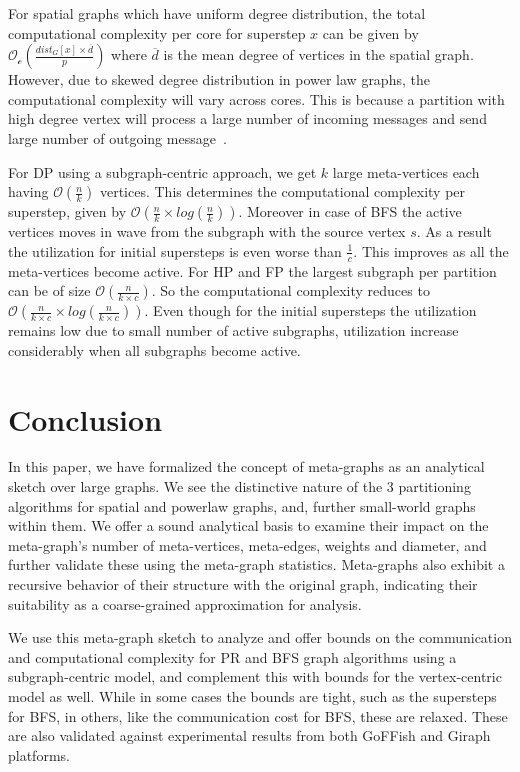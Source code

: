 \documentclass[10pt,conference, compsocconf]{IEEEtran}
\begin{document}
 For spatial graphs which have uniform degree distribution, the total computational complexity per core for superstep $x$ can be given by $\mathcal{O_c}(\frac{dist_G[x] \times \overline{d}}{p})$ where $\overline{d}$ is the mean degree of vertices in the spatial graph. However, due to skewed degree distribution in power law graphs, the computational complexity will vary across cores. This is because a partition with high degree vertex will process a large number of incoming messages and send large number of outgoing message~\cite{graphlab}.
 

For DP using a subgraph-centric approach, we get $k$ large meta-vertices each having $\mathcal{O}(\frac{n}{k})$ vertices. This determines the computational complexity per superstep, given by $\mathcal{O}(\frac{n}{k} \times log(\frac{n}{k}))$. Moreover in case of BFS the active vertices moves in wave from the subgraph with the source vertex $s$. As a result the  utilization  for initial supersteps is even worse than $\frac{1}{c}$. This improves as all the meta-vertices become active. For HP and FP the largest subgraph per partition can be of size $\mathcal{O}(\frac{n}{k \times c})$. So the computational complexity reduces to $\mathcal{O}(\frac{n}{k \times c} \times log(\frac{n}{k \times c}))$. Even though for the initial supersteps the utilization remains low due to small number of active subgraphs, utilization increase considerably when all subgraphs become active.






\section{Conclusion}\label{sec:conclusion}


In this paper, we have formalized the concept of meta-graphs as an analytical sketch over large graphs. We see the distinctive nature of the $3$ partitioning algorithms for spatial and powerlaw graphs, and, further small-world graphs within them. We offer a sound analytical basis to examine their impact on the meta-graph's number of meta-vertices, meta-edges, weights and diameter, and further validate these using the meta-graph statistics. Meta-graphs also exhibit a recursive behavior of their structure with the original graph, indicating their suitability as a coarse-grained approximation for analysis.

We use this meta-graph sketch to analyze and offer bounds on the communication and computational complexity for PR and BFS graph algorithms using a subgraph-centric model, and complement this with bounds for the vertex-centric model as well. While in some cases the bounds are tight, such as the supersteps for BFS, in others, like the communication cost for BFS, these are relaxed. These are also validated against experimental results from both GoFFish and Giraph platforms.
\end{document}
